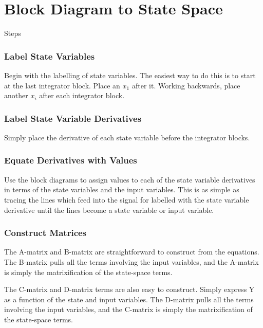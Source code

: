 \documentclass{../templates/topic}
\begin{document}
\chapter{Block Diagram to State Space}


\begin{section}{Steps}
	
	\subsection{Label State Variables}
		Begin with the labelling of state variables. The easiest way to do this is to start at the last integrator block. Place an $x_1$ after it. Working backwards, place another $x_i$ after each integrator block.
		
	\subsection{Label State Variable Derivatives}
		Simply place the derivative of each state variable before the integrator blocks.
		
	\subsection{Equate Derivatives with Values}
		Use the block diagrams to assign values to each of the state variable derivatives in terms of the state variables and the input variables. This is as simple as tracing the lines which feed into the signal for labelled with the state variable derivative until the lines become a state variable or input variable.
		
	\subsection{Construct Matrices}
		The A-matrix and B-matrix are straightforward to construct from the equations. The B-matrix pulls all the terms involving the input variables, and the A-matrix is simply the matrixification of the state-space terms.
		
		The C-matrix and D-matrix terms are also easy to construct. Simply express Y as a function of the state and input variables. The D-matrix pulls all the terms involving the input variables, and the C-matrix is simply the matrixification of the state-space terms.
	
	
\end{section}
\end{document}
